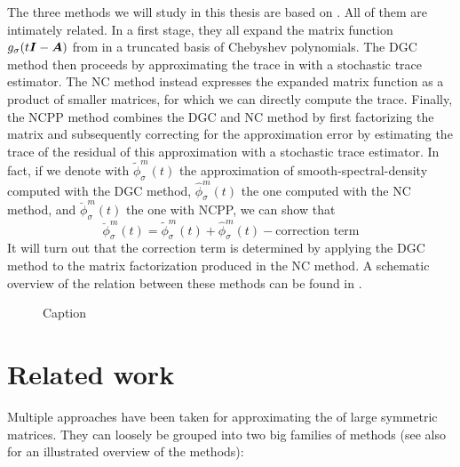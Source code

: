 The three methods we will study in this thesis are based on \cite{lin2017randomized}.
All of them are intimately related. In a first stage, they all expand the matrix
function $g_{\sigma}(t\boldsymbol{I} - \boldsymbol{A})$ from
 in a truncated basis of
Chebyshev polynomials. The \gls{DGC} method then proceeds by approximating the
trace in  with a stochastic
trace estimator. The \gls{NC} method instead expresses the expanded matrix function
as a product of smaller matrices, for which we can directly compute the trace.
Finally, the \gls{NCPP} method combines the \gls{DGC} and \gls{NC} method
by first factorizing the matrix and subsequently correcting for the approximation
error by estimating the trace of the residual of this approximation with a stochastic trace estimator.
In fact, if we denote with $\widetilde{\phi}_{\sigma}^m(t)$ the approximation
of \gls{smooth-spectral-density} computed with the \gls{DGC} method, $\widehat{\phi}_{\sigma}^m(t)$ the
one computed with the \gls{NC} method, and $\breve{\phi}_{\sigma}^m(t)$ the one
with \gls{NCPP}, we can show that
\begin{equation}
    \breve{\phi}_{\sigma}^m(t) = \widetilde{\phi}_{\sigma}^m(t) + \widehat{\phi}_{\sigma}^m(t) - \text{correction term}
    \label{equ:1-introduction-relation-methods}
\end{equation}
It will turn out that the correction term is determined by applying
the \gls{DGC} method to the matrix factorization produced in the \gls{NC} method.
A schematic overview of the relation between these methods can be found
in .

\begin{figure}[ht]
    \centering
    
    \caption{Caption}
    \label{fig:1-introduction-methods-overview}
\end{figure}


\section{Related work}
\label{sec:1-introduction-related}

Multiple approaches have been taken for approximating the 
of large symmetric matrices. They can loosely be grouped into two big families
of methods (see also  for an
illustrated overview of the methods):

